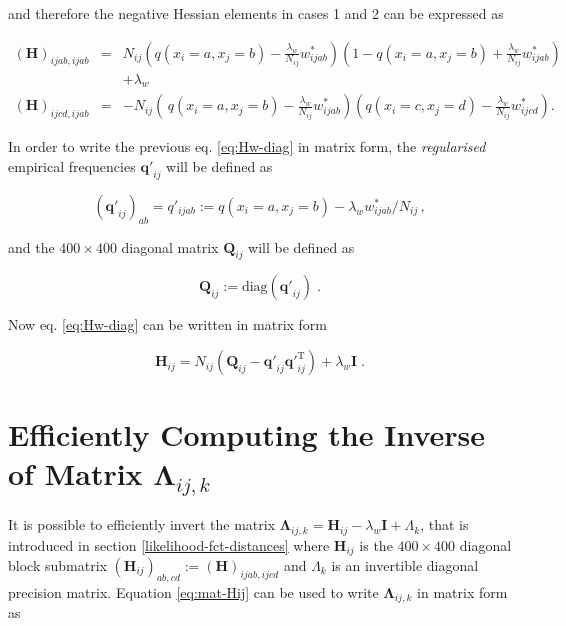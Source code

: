 \documentclass[11pt,a4paper,twoside]{book}
\newcommand{\eq}{\!=\!}
\renewcommand{\H}{\mathbf{H}}
\newcommand{\I}{\mathbf{I}}
\newcommand{\Lijk}{\mathbf{\Lambda}_{ij,k}}
\newcommand{\Qij}{\mathbf{Q}_{ij}}
\newcommand{\qij}{\mathbf{q\prime}_{ij}}
\newcommand{\wijab}{w_{ijab}}
\newcommand{\wijcd}{w_{ijcd}}
\theoremstyle{definition}
\theoremstyle{definition}
\theoremstyle{remark}
\begin{document}
and therefore the negative Hessian elements in cases 1 and 2 can be
expressed as

\begin{eqnarray}
   (\H)_{ijab, ijab} &=& N_{ij} \left( q(x_i \eq a, x_j \eq b)  - \frac{\lambda_w}{N_{ij}} \wijab^* \right) \left( 1 - q(x_i \eq a, x_j \eq b) +\frac{\lambda_w}{N_{ij}} \wijab^* \right) \nonumber\\
                      && +\lambda_w \\
   (\H)_{ijcd, ijab} &=& -N_{ij} \left(\,q(x_i \eq a, x_j \eq b)  - \frac{\lambda_w}{N_{ij}} \wijab^* \right) \left( q(x_i \eq c, x_j \eq d) -\frac{\lambda_w}{N_{ij}} \wijcd^* \right) .
\label{eq:Hw-diag}
\end{eqnarray}

In order to write the previous eq. \eqref{eq:Hw-diag} in matrix form, the
\emph{regularised} empirical frequencies \(\qij\) will be defined as

\begin{equation}
    (\qij)_{ab} = q'_{ijab} := q(x_i \eq a, x_j \eq b) - \lambda_w  \wijab^* / N_{ij} \,,
\end{equation}

and the \(400 \times 400\) diagonal matrix \(\Qij\) will be defined as

\begin{equation}
    \Qij := \text{diag}(\qij) \; .
\end{equation}

Now eq. \eqref{eq:Hw-diag} can be written in matrix form

\begin{equation}
     \H_{ij} = N_{ij} \left( \Qij -  \qij \qij^{\mathrm{T}} \right)  + \lambda_w \I \; .
\label{eq:mat-Hij}
\end{equation}

\section{\texorpdfstring{Efficiently Computing the Inverse of Matrix
\(\Lijk\)}{Efficiently Computing the Inverse of Matrix \textbackslash{}Lijk}}\label{inv-lambda-ij-k}

It is possible to efficiently invert the matrix
\(\Lijk = \H_{ij} - \lambda_w \I + \Lambda_k\), that is introduced in
section \ref{likelihood-fct-distances} where \(\H_{ij}\) is the
\(400 \times 400\) diagonal block submatrix
\((\H_{ij})_{ab,cd} := (\H)_{ijab,ijcd}\) and \(\Lambda_k\) is an
invertible diagonal precision matrix. Equation \eqref{eq:mat-Hij} can be
used to write \(\Lijk\) in matrix form as
\end{document}
